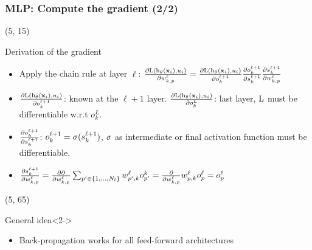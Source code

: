\begin{frame}
  \frametitle{\acl{MLP}: Compute the gradient (2/2)}

  \begin{textblock}{90}(5, 15)
    \begin{block}{Derivation of the gradient}
      \begin{itemize}
      \item Apply the chain rule at layer $\ell$:
        $
        \frac{\partial \mathrm{L} \left ( {\mathrm{h}_{\mathbf{\theta}} \left ( {\mathbf{x}_i} \right ), u_i} \right )}{\partial w_{k,p}^\ell} =
        \frac{\partial \mathrm{L} \left ( {\mathrm{h}_{\mathbf{\theta}} \left ( {\mathbf{x}_i} \right ), u_i} \right )}{\partial o_k^{\ell+1}} \frac{\partial o_k^{\ell+1}}{\partial s_k^{\ell+1}} \frac{\partial s_k^{\ell+1}}{\partial w_{k,p}^{\ell}}
        $

      \item $\frac{\partial \mathrm{L} \left ( {\mathrm{h}_{\mathbf{\theta}} \left ( {\mathbf{x}_i} \right ), u_i} \right )}{\partial o_k^{\ell+1}}$: known at the $\ell+1$ layer. $\frac{\partial \mathrm{L} \left ( {\mathrm{h}_{\mathbf{\theta}} \left ( {\mathbf{x}_i} \right ), u_i} \right )}{\partial o_k^{L}}$: last layer, $\mathrm{L}$ must be differentiable w.r.t $o_k^{L}$.


      \item $\frac{\partial o_k^{\ell+1}}{\partial s_k^{\ell+1}}$: $o_k^{\ell+1} = \mathrm{\sigma}(s_k^{\ell+1})$, $\mathrm{\sigma}$ as intermediate or final activation function must be differentiable.

      \item $\frac{\partial s_k^{\ell+1}}{\partial w_{k,p}^{\ell}} = \frac{\partial \partial}{\partial w_{k,p}^{\ell}} \sum_{p' \in \left\{1,\ldots,N_l \right\}}  w_{p', k}^{\ell}o_{p'}^{k}= \frac{\partial }{\partial w_{k,p}^{\ell}}  w_{p, k}^{\ell}o_{p}^{\ell}=o_{p}^{\ell}$

    \end{itemize}
    \end{block}
  \end{textblock}

  \begin{textblock}{90}(5, 65)
    \begin{block}{General idea}<2->
      \begin{itemize}
      \item Back-propagation works for all feed-forward architectures
        \hyperlink{MLP_Learning_2}{}
      \end{itemize}
    \end{block}
  \end{textblock}
\end{frame}
